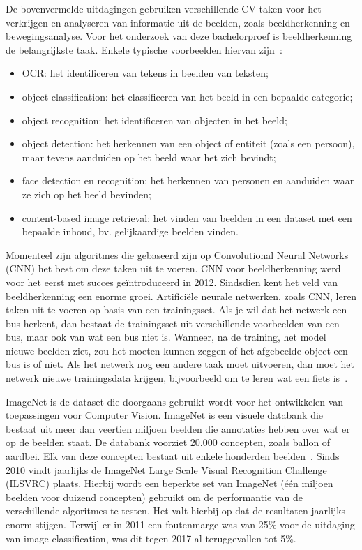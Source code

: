 De bovenvermelde uitdagingen gebruiken verschillende CV-taken voor het verkrijgen en analyseren van informatie uit de beelden, zoals beeldherkenning en bewegingsanalyse. Voor het onderzoek van deze bachelorproef is beeldherkenning de belangrijkste taak. Enkele typische voorbeelden hiervan zijn~\autocite{wikiCV}:
\begin{itemize}
	\item OCR: het identificeren van tekens in beelden van teksten;
	\item object classification: het classificeren van het beeld in een bepaalde categorie;
	\item object recognition: het identificeren van objecten in het beeld;
	\item object detection: het herkennen van een object of entiteit (zoals een persoon), maar tevens aanduiden op het beeld waar het zich bevindt;
	\item face detection en recognition: het herkennen van personen en aanduiden waar ze zich op het beeld bevinden;
	\item content-based image retrieval: het vinden van beelden in een dataset met een bepaalde inhoud, bv. gelijkaardige beelden vinden.
\end{itemize}


Momenteel zijn algoritmes die gebaseerd zijn op Convolutional Neural Networks (CNN) het best om deze taken uit te voeren. CNN voor beeldherkenning werd voor het eerst met succes geïntroduceerd in 2012. Sindsdien kent het veld van beeldherkenning een enorme groei. Artifici\"{e}le neurale netwerken, zoals CNN, leren taken uit te voeren op basis van een trainingsset. Als je wil dat het netwerk een bus herkent, dan bestaat de trainingsset uit verschillende voorbeelden van een bus, maar ook van wat een bus niet is. Wanneer, na de training, het model nieuwe beelden ziet, zou het moeten kunnen zeggen of het afgebeelde object een bus is of niet. Als het netwerk nog een andere taak moet uitvoeren, dan moet het netwerk nieuwe trainingsdata krijgen, bijvoorbeeld om te leren wat een fiets is~\autocite{Pokharna2016}. 

ImageNet is de dataset die doorgaans gebruikt wordt voor het ontwikkelen van toepassingen voor Computer Vision. ImageNet is een visuele databank die bestaat uit meer dan veertien miljoen beelden die annotaties hebben over wat er op de beelden staat. De databank voorziet 20.000 concepten, zoals ballon of aardbei. Elk van deze concepten bestaat uit enkele honderden beelden~\autocites{WikiImageNet}{Brownlee2019a}. Sinds 2010 vindt jaarlijks de ImageNet Large Scale Visual Recognition Challenge (ILSVRC) plaats. Hierbij wordt een beperkte set van ImageNet (één miljoen beelden voor duizend concepten) gebruikt om de performantie van de verschillende algoritmes te testen. Het valt hierbij op dat de resultaten jaarlijks enorm stijgen. Terwijl er in 2011 een foutenmarge was van 25\% voor de uitdaging van image classification, was dit tegen 2017 al teruggevallen tot 5\%. 


